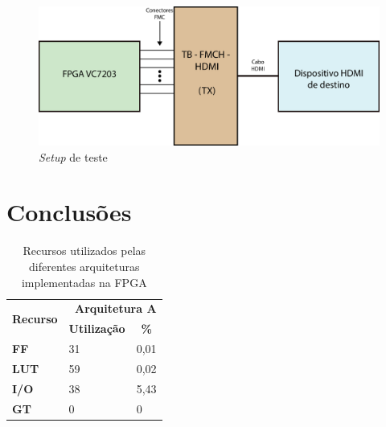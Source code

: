 \documentclass[11pt,a4paper]{article}
\begin{document}
		\begin{figure}[h]
		\begin{center}
			\includegraphics[width=1.0\textwidth]{planAsch} 
			\caption{\textit{Setup} de teste}
		\end{center}
	\end{figure}

	\section{Conclusões}
	
		\begin{table}[h!]
			\centering
			\caption{Recursos utilizados pelas diferentes arquiteturas implementadas na FPGA}
			\label{table:recursos_a_b_c}
				\begin{tabular}{l|ll}
					\hline
					\multicolumn{1}{c|}{\multirow{2}{*}{\textbf{Recurso}}} & \multicolumn{2}{r}{\textbf{Arquitetura A}} \\ \cline{2-3} 
					\multicolumn{1}{c|}{}                                  & \multicolumn{1}{c}{\textbf{Utilização}} & \multicolumn{1}{c}{\textbf{\%}} \\ \hline
					\textbf{FF}                                            & 31                                      & 0,01                            \\
					\textbf{LUT}                                           & 59                                      & 0,02                            \\
					\textbf{I/O}                                           & 38                                      & 5,43         			   		\\
					\textbf{GT}                                            & 0                                       & 0                               \\ \hline
				\end{tabular}%
		\end{table}
	
\end{document}
